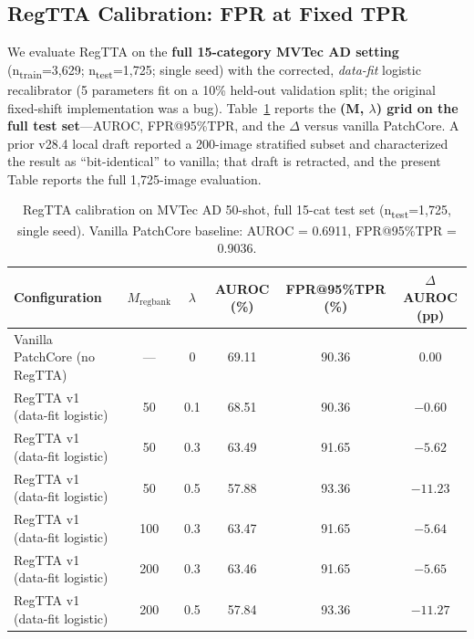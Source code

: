\documentclass[journal]{IEEEtran}
\begin{document}
\subsection{RegTTA Calibration: FPR at Fixed TPR}
\label{sec:vm}
We evaluate RegTTA on the \textbf{full 15-category MVTec AD setting} (n\textsubscript{train}=3{,}629; n\textsubscript{test}=1{,}725; single seed) with the corrected, \emph{data-fit} logistic recalibrator (5 parameters fit on a 10\% held-out validation split; the original fixed-shift implementation was a bug). Table~\ref{tab:regtta} reports the \textbf{(M, $\lambda$) grid on the full test set}---AUROC, FPR@95\%TPR, and the $\Delta$ versus vanilla PatchCore. A prior v28.4 local draft reported a 200-image stratified subset and characterized the result as ``bit-identical'' to vanilla; that draft is retracted, and the present Table reports the full 1{,}725-image evaluation.

\begin{table}[!ht]
\centering
\caption{RegTTA calibration on MVTec AD 50-shot, full 15-cat test set
(n\textsubscript{test}=1{,}725, single seed). Vanilla PatchCore baseline:
AUROC = 0.6911, FPR@95\%TPR = 0.9036.}
\label{tab:regtta}
\begin{tabular}{lccccc}
\toprule
Configuration & $M_{\mathrm{regbank}}$ & $\lambda$ & AUROC (\%) & FPR@95\%TPR (\%) & $\Delta$AUROC (pp) \\
\midrule
Vanilla PatchCore (no RegTTA) & --- & 0   & 69.11 & 90.36 & 0.00 \\
\midrule
RegTTA v1 (data-fit logistic) & 50  & 0.1 & 68.51 & 90.36 & \textbf{$-0.60$} \\
RegTTA v1 (data-fit logistic) & 50  & 0.3 & 63.49 & 91.65 & \textbf{$-5.62$} \\
RegTTA v1 (data-fit logistic) & 50  & 0.5 & 57.88 & 93.36 & $\mathbf{-11.23}$ \\
RegTTA v1 (data-fit logistic) & 100 & 0.3 & 63.47 & 91.65 & \textbf{$-5.64$} \\
RegTTA v1 (data-fit logistic) & 200 & 0.3 & 63.46 & 91.65 & \textbf{$-5.65$} \\
RegTTA v1 (data-fit logistic) & 200 & 0.5 & 57.84 & 93.36 & $\mathbf{-11.27}$ \\
\midrule
\bottomrule
\end{tabular}
\end{table}
\end{document}
